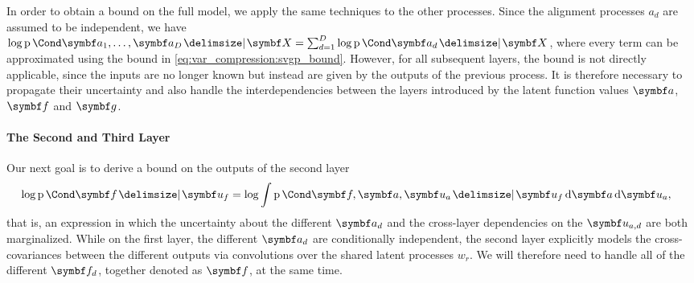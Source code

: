 In order to obtain a bound on the full model, we apply the same techniques to the other processes.
Since the alignment processes $a_d$ are assumed to be independent, we have $\log \Prob{\rv{a_1}, \dots, \rv{a_D} \given \mat{X}} = \sum_{d=1}^D \log \Prob{\rv{a_d} \given \mat{X}}$, where every term can be approximated using the bound in \cref{eq:var_compression:svgp_bound}.
However, for all subsequent layers, the bound is not directly applicable, since the inputs are no longer known but instead are given by the outputs of the previous process.
It is therefore necessary to propagate their uncertainty and also handle the interdependencies between the layers introduced by the latent function values $\rv{a}$, $\rv{f}$ and $\rv{g}$.

\paragraph{The Second and Third Layer}
\label{toc:var_compression:other_layers}
Our next goal is to derive a bound on the outputs of the second layer
\begin{align}
    \begin{split}
        \log \Prob{\rv{f} \given \mat{u_f}} &= \log \int \Prob{\rv{f}, \rv{a}, \mat{u_a} \given \mat{u_f}} \diff \rv{a} \diff \mat{u_a},
    \end{split}
\end{align}
that is, an expression in which the uncertainty about the different $\rv{a_d}$  and the cross-layer dependencies on the $\rv{u_{a, d}}$ are both marginalized.
While on the first layer, the different $\rv{a_d}$ are conditionally independent, the second layer explicitly models the cross-covariances between the different outputs via convolutions over the shared latent processes $w_r$.
We will therefore need to handle all of the different $\rv{f_d}$, together denoted as $\rv{f}$, at the same time.

